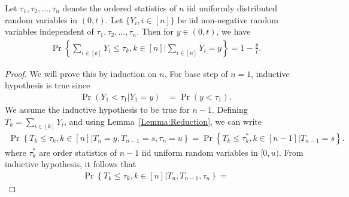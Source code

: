 \documentclass[a4paper,english,10pt]{article}
\begin{document}
\begin{lem}
\label{Lemma:CndUniform}
Let $\tau_1,\tau_2,\ldots,\tau_n$ denote the ordered statistics of $n$ iid uniformly distributed random variables in $(0,t)$. Let $\{Y_i,i \in [n]\}$ be iid non-negative random variables independent of $\tau_1,\tau_2,\ldots,\tau_n$. Then for $y \in (0,t)$, we have
\begin{align}
\Pr\left\{\sum_{i\in [k]}Y_i \leq \tau_k,k \in [n] \Big| \sum_{i\in [n]}Y_i=y \right\} = 
1-\frac{y}{t}.
\end{align}
\end{lem}
\begin{proof}
We will prove this by induction on $n$. For base step of $n = 1$, inductive hypothesis is true since
\begin{align*}
\Pr(Y_1 < \tau_1 | Y_1=y) &= \Pr(y < \tau_1).
\end{align*}
We assume the inductive hypothesis to be true for $n-1$. 
Defining $T_k = \sum_{i \in [k]}Y_i$, %
and using Lemma~\ref{Lemma:Reduction}, we can write
\begin{align*}
\Pr\left\{ T_k \leq \tau_k,k\in [n] \Big| T_n = y, T_{n-1} = s, \tau_n = u \right\}= 
\Pr\left\{T_k \leq \tau_k^{\ast},k \in [n-1] \Big| T_{n-1}=s \right\}.
\end{align*}
where $\tau_k^*$ are order statistics of $n-1$ iid uniform random variables in $[0,u)$. 
From inductive hypothesis, it follows that %
\begin{align*}
\Pr\left\{T_k \leq \tau_k,k\in [n] \Big| T_n, T_{n-1}, \tau_n \right\}=

\end{align*}
\end{proof}
\end{document}

